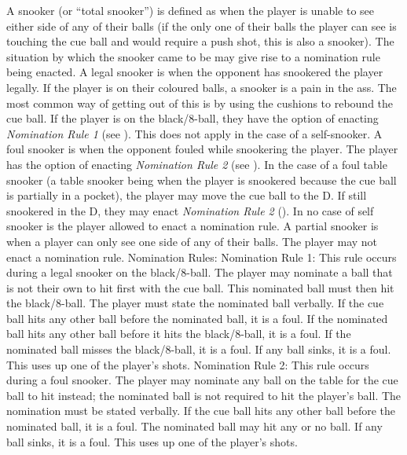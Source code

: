  A snooker (or “total snooker”) is defined as when the player is unable to see either side of any of their balls (if the only one of their balls the player can see is touching the cue ball and would require a push shot, this is also a snooker). The situation by which the snooker came to be may give rise to a nomination rule being enacted.%
 A legal snooker is when the opponent has snookered the player legally.%
\subruleitem If the player is on their coloured balls, a snooker is a pain in the ass. The most common way of getting out of this is by using the cushions to rebound the cue ball.%
\subruleitem If the player is on the black/8-ball, they have the option of enacting \emph{Nomination Rule 1} (see ). This does not apply in the case of a self-snooker.%
 A foul snooker is when the opponent fouled while snookering the player.%
\subruleitem The player has the option of enacting \emph{Nomination Rule 2} (see ).%
\subruleitem In the case of a foul table snooker (a table snooker being when the player is snookered because the cue ball is partially in a pocket), the player may move the cue ball to the D. If still snookered in the D, they may enact \emph{Nomination Rule 2} ().%
 In no case of self snooker is the player allowed to enact a nomination rule.%
 A partial snooker is when a player can only see one side of any of their balls. The player may not enact a nomination rule.%
 Nomination Rules:%
Nomination Rule 1: This rule occurs during a legal snooker on the black/8-ball. The player may nominate a ball that is not their own to hit first with the cue ball. This nominated ball must then hit the black/8-ball. The player must state the nominated ball verbally. If the cue ball hits any other ball before the nominated ball, it is a foul. If the nominated ball hits any other ball before it hits the black/8-ball, it is a foul. If the nominated ball misses the black/8-ball, it is a foul. If any ball sinks, it is a foul. This uses up one of the player's shots.%
Nomination Rule 2: This rule occurs during a foul snooker. The player may nominate any ball on the table for the cue ball to hit instead; the nominated ball is not required to hit the player's ball. The nomination must be stated verbally. If the cue ball hits any other ball before the nominated ball, it is a foul. The nominated ball may hit any or no ball. If any ball sinks, it is a foul. This uses up one of the player's shots.%
 {}%

